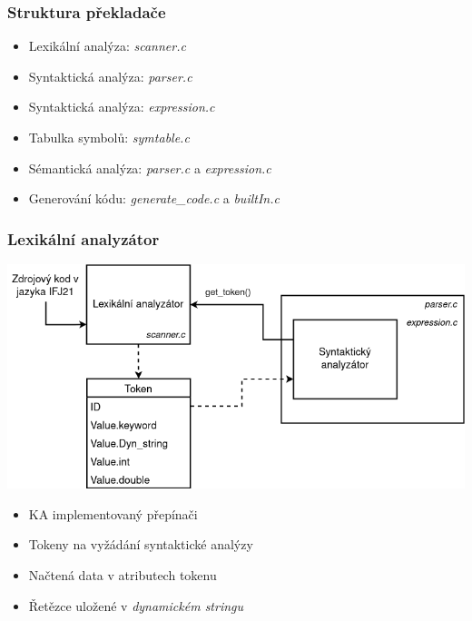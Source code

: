 \begin{frame}
  \frametitle{Struktura překladače}
    \begin{itemize}
        \setlength\itemsep{1em}
        \item Lexikální analýza: \emph{scanner.c}
        \item Syntaktická analýza: \emph{parser.c}
        \item Syntaktická analýza: \emph{expression.c}
        \item Tabulka symbolů: \emph{symtable.c}
        \item Sémantická analýza: \emph{parser.c} a \emph{expression.c}
        \item Generování kódu: \emph{generate\_code.c} a \emph{builtIn.c}
    \end{itemize}
\end{frame}



\begin{frame}
  \frametitle{Lexikální analyzátor}
    \centering
    \includegraphics[scale=0.34,keepaspectratio]{img/DiagramLex.png}

  \vspace{1em}

    \begin{itemize}
        \item KA implementovaný přepínači
        \item Tokeny na vyžádání syntaktické analýzy
        \item Načtená data v atributech tokenu
        \item Řetězce uložené v \emph{dynamickém stringu}
    \end{itemize}
\end{frame}



